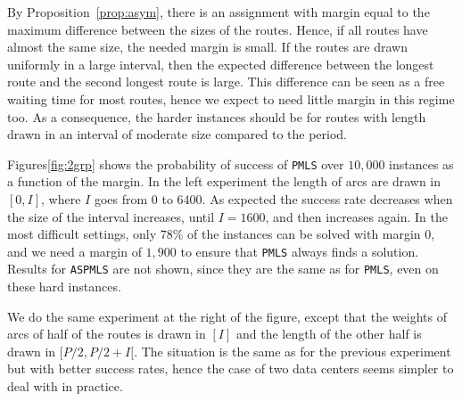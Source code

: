 \documentclass[a4paper,10pt]{journal}
\newcommand\PMLS{\texttt{PMLS}\xspace}
\newcommand\ASPMLS{\texttt{ASPMLS}\xspace}
\begin{document}
		  By Proposition~\ref{prop:asym}, there is an assignment with margin equal to the maximum difference
    between the sizes of the routes. Hence, if all routes have almost the same size, the needed margin is small. If the routes are drawn uniformly in a large interval, then the expected difference between the longest route and the second longest route is large. This difference can be seen as a free waiting time for most routes, hence we expect to need little margin in this regime too. As a consequence, the harder instances should be for routes with length drawn in an interval of moderate size compared to the period.

  	Figures\ref{fig:2grp} shows the probability of success of \PMLS  over $10,000$ instances as a function of the margin. In the left experiment the length of arcs are drawn in $[0,I]$, where $I$ goes from $0$ to $6400$. As expected the success rate decreases when the size of the interval increases, until $I = 1600$, and then increases again.  In the most difficult settings, only $78\%$ of the instances can be solved with margin $0$, and we need a margin of $1,900$ to ensure that \PMLS always finds a solution. Results for \ASPMLS are not shown, since they are the same as for \PMLS, even on these hard instances.

 	 We do the same experiment at the right of the figure, except that the weights of arcs of half of the routes is drawn in $[I]$ and the length of the other half is drawn in $[P/2,P/2 + I[$. The situation is the same as for the previous experiment but with better success rates, hence the case of two data centers seems simpler to deal with in practice.
  
\end{document}
